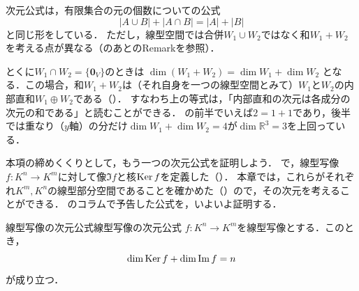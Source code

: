 \begin{remark}[次元公式の読み方]
  次元公式は，有限集合の元の個数についての公式
  \[
    |A \cup B| + |A \cap B| = |A| + |B|
  \]
  と同じ形をしている．
  ただし，線型空間では合併$W_1 \cup W_2$ではなく和$W_1 + W_2$を考える点が異なる（のあとのRemarkを参照）．

  とくに$W_1 \cap W_2 = \{\bm{0}_V\}$のときは
  $\dim(W_1 + W_2) = \dim W_1 + \dim W_2$
  となる．この場合，和$W_1 + W_2$は（それ自身を一つの線型空間とみて）$W_1$と$W_2$の内部直和$W_1 \oplus W_2$である（）．
  すなわち上の等式は，「内部直和の次元は各成分の次元の和である」と読むことができる．
  の前半でいえば$2=1+1$であり，後半では重なり（$y$軸）の分だけ$\dim W_1+\dim W_2=4$が$\dim\mathbb{R}^3=3$を上回っている．
\end{remark}

本項の締めくくりとして，もう一つの次元公式を証明しよう．
で，線型写像$f \colon K^n \to K^m$に対して像$\Im f$と核$\operatorname{Ker} f$を定義した（）．
本章では，これらがそれぞれ$K^m,K^n$の線型部分空間であることを確かめた（）ので，その次元を考えることができる．
のコラムで予告した公式を，いよいよ証明する．

\begin{theorem}{線型写像の次元公式}{線型写像の次元公式}
  $f \colon K^n \to K^m$を線型写像とする．このとき，
  \[
    \dim \operatorname{Ker} f + \dim \operatorname{Im} f = n
  \]
  が成り立つ．
\end{theorem}

